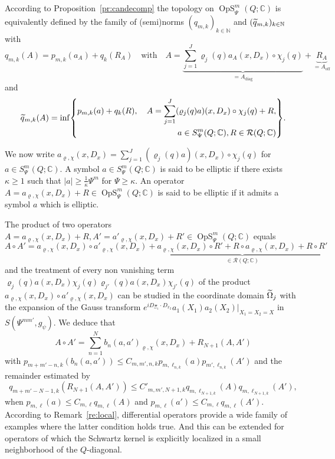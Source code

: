 \documentclass[AHL,Unicode,longabstracts]{cedram}
\newcommand{\C}{\mathbb{C}}
\newcommand{\N}{\mathbb{N}}
\newcommand{\clR}{\mathcal{R}}
\DeclareMathOperator{\OpS}{OpS}
\DeclareMathOperator{\offf}{off}
\DeclareMathOperator{\diag}{diag}
\let\oldtilde\tilde
\renewcommand*{\tilde}[1]{\mathchoice{\widetilde{#1}}{\widetilde{#1}}{\oldtilde{#1}}{\oldtilde{#1}}}
\let\originalleft\left
\let\originalright\right
\renewcommand{\left}{\mathopen{}\mathclose\bgroup\originalleft}
\renewcommand{\right}{\aftergroup\egroup\originalright}
\begin{document}
\begin{defi}\label{de:globaltop}
According to Proposition~\ref{pr:candecomp} the topology on $\OpS^{m}_{\Psi}(Q;\C)$ is equivalently defined by the family of (semi)norms $(q_{m,k})_{k\in\N}$ and $(\tilde{q}_{m,k})_{k\in\N}$ with
\[
q_{m,k}(A)= p_{m,k}(a_{A})+q_{k}(R_{A})\quad \text{with}\quad A=\underbrace{\sum_{j=1}^{J}\varrho_{j}(q)a_{A}(x,D_{x})\circ \chi_{j}(q)}_{=A_{\diag}} +\underbrace{R_{A}}_{=A_{\offf}}
\]
and
\begin{align*}
\tilde{q}_{m,k}(A)=\inf\left\{
\begin{aligned}
p_{m,k}(a)+q_{k}(R),\quad A=\sum_{j=1}^{J}(\varrho_{j}(q)a)(x,D_{x})\circ \chi_{j}(q)+R,\\ a\in S^{m}_{\Psi}(Q;\C), R\in \clR(Q;\C)
\end{aligned}
\right\}.
\end{align*}
\end{defi}

\begin{defi}\label{de:ellipticity}
We now write $a_{\varrho,\chi}(x,D_{x})=\sum_{j=1}^{J}(\varrho_{j}(q)a)(x,D_{x})\circ \chi_{j}(q)$ for $a\in S^{m}_{\Psi}(Q;\C)$. A symbol $a\in S^{m}_{\Psi}(Q;\C)$ is said to be elliptic if there exists $\kappa\geq 1$ such that $|a|\geq \frac{1}{\kappa}\Psi^{m}$ for $\Psi\geq \kappa$. An operator $A=a_{\varrho,\chi}(x,D_{x})+R\in \OpS^{m}_{\Psi}(Q;\C)$ is said to be elliptic if it admits a symbol $a$ which is elliptic.
\end{defi}

The product of two operators $A=a_{\varrho,\chi}(x,D_{x})+R, A'=a'_{\varrho,\chi}(x,D_{x})+R'\in \OpS^{m}_{\Psi}(Q;\C)$ equals
\[
A\circ A'=a_{\varrho,\chi}(x,D_{x})\circ a'_{\varrho,\chi}(x,D_{x}) + \underbrace{a_{\varrho,\chi}(x,D_{x})\circ R'+R\circ a_{\varrho,\chi}(x,D_{x})+R\circ R'}_{\in \clR(Q;\C)}
\]
and the treatment of every non vanishing term $\varrho_{j}(q)a(x,D_{x})\chi_{j}(q)\varrho_{j'}(q)a(x,D_{x})\chi_{j'}(q)$ of the product $a_{\varrho,\chi}(x,D_{x})\circ a'_{\varrho,\chi}(x,D_{x})$ can be studied in the coordinate domain $\tilde{\Omega}_{j}$ with the expansion of the Gauss transform $e^{iD_{\Xi_{1}}\cdot D_{x_{2}}}a_{1}(X_{1})a_{2}(X_{2})|_{X_{1}=X_{2}=X}$ in $S(\Psi^{mm'},g_{\psi})$. We deduce that
\[
A\circ A'=\sum_{n=1}^{N}b_{n}(a,a')_{\varrho,\chi}(x,D_{x})+R_{N+1}(A,A')
\]
with $p_{m+m'-n,k}(b_{n}(a,a'))\leq C_{m,m',n,k}p_{m,\ell_{n,k}}(a)p_{m',\ell_{n,k}}(A')$ and the remainder estimated by
\[
q_{m+m'-N-1,k}(R_{N+1}(A,A'))\leq C'_{m,m',N+1,k}q_{m,\ell_{N+1,k}}(A)q_{m,\ell_{N+1,k}}(A'),
\]
when $p_{m,\ell}(a)\leq C_{m,\ell} q_{m,\ell}(A)$ and $p_{m,\ell}(a')\leq C_{m,\ell} q_{m,\ell}(A')$. According to Remark~\ref{re:local}, differential operators provide a wide family of examples where the latter condition holds true. And this can be extended for operators of which the Schwartz kernel is explicitly localized in a small neighborhood of the $Q$-diagonal.
\end{document}
